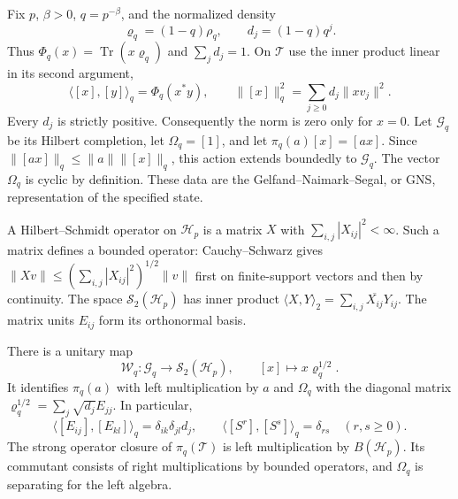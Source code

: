 Fix $p$, $\beta>0$, $q=p^{-\beta}$, and the normalized density
\[
 \varrho_q=(1-q)\rho_q,\qquad d_j=(1-q)q^j.
\]
Thus $\Phi_q(x)=\operatorname{Tr}(x\varrho_q)$ and
$\sum_jd_j=1$. On $\mathcal T$ use the inner product linear in
its second argument,
\begin{equation}
 \langle[x],[y]\rangle_q=\Phi_q(x^*y),\qquad
 \|[x]\|_q^2=\sum_{j\geq0}d_j\|xv_j\|^2.
 \label{v4-arith:thermal:gns-norm}
\end{equation}
Every $d_j$ is strictly positive. Consequently the norm is zero
only for $x=0$. Let $\mathscr G_q$ be its Hilbert completion,
let $\Omega_q=[1]$, and let $\pi_q(a)[x]=[ax]$.
Since $\|[ax]\|_q\leq\|a\|\|[x]\|_q$, this action extends
boundedly to $\mathscr G_q$. The vector $\Omega_q$ is cyclic
by definition. These data are the Gelfand--Naimark--Segal, or GNS,
representation of the specified state.

A Hilbert--Schmidt operator on $\mathscr H_p$ is a matrix $X$
with $\sum_{i,j}|X_{ij}|^2<\infty$. Such a matrix defines a
bounded operator: Cauchy--Schwarz gives
$\|Xv\|\leq(\sum_{i,j}|X_{ij}|^2)^{1/2}\|v\|$ first on
finite-support vectors and then by continuity. The space
$\mathcal S_2(\mathscr H_p)$ has inner product
$\langle X,Y\rangle_2=\sum_{i,j}\overline{X_{ij}}Y_{ij}$.
The matrix units $E_{ij}$ form its orthonormal basis.

\begin{theorem}
\label{v4-arith:thermal:gns-carrier}
There is a unitary map
\begin{equation}
 \mathcal W_q:\mathscr G_q\longrightarrow\mathcal S_2(\mathscr H_p),
 \qquad [x]\longmapsto x\varrho_q^{1/2}.
 \label{v4-arith:thermal:gns-unitary}
\end{equation}
It identifies $\pi_q(a)$ with left multiplication by $a$ and
$\Omega_q$ with the diagonal matrix
$\varrho_q^{1/2}=\sum_j\sqrt{d_j}E_{jj}$. In particular,
\[
 \langle[E_{ij}],[E_{kl}]\rangle_q
       =\delta_{ik}\delta_{jl}d_j,
 \qquad
 \langle[S^r],[S^s]\rangle_q=\delta_{rs}
       \quad(r,s\geq0).
\]
The strong operator closure of $\pi_q(\mathcal T)$ is left
multiplication by $B(\mathscr H_p)$. Its commutant consists of
right multiplications by bounded operators, and $\Omega_q$ is
separating for the left algebra.
\end{theorem}

